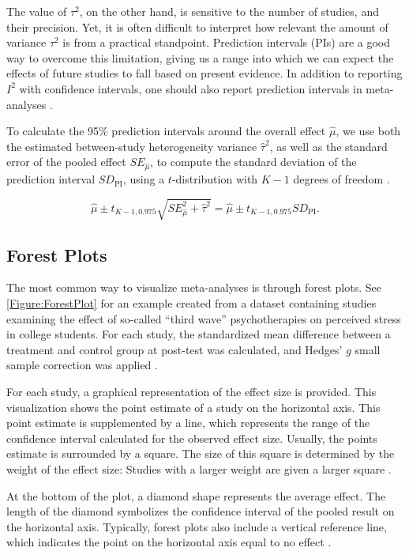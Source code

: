 \documentclass[../../../main.tex]{subfiles}
\begin{document}
The value of $\tau^2$, on the other hand, is sensitive to the number of studies, and their precision. Yet, it is often difficult to interpret how relevant the amount of variance $\tau^2$ is from a practical standpoint. Prediction intervals (PIs) are a good way to overcome this limitation, giving us a range into which we can expect the effects of future studies to fall based on present evidence. In addition to reporting $I^2$ with confidence intervals, one should also report prediction intervals in meta-analyses \autocite{Harrer2021}.

To calculate the 95\% prediction intervals around the overall effect $\hat{\mu}$, we use both the estimated between-study heterogeneity variance $\hat{\tau}^2$, as well as the standard error of the pooled effect $SE_{\hat{\mu}}$, to compute the standard deviation of the prediction interval $SD_\text{PI}$, using a $t$-distribution with $K-1$ degrees of freedom \autocite{Harrer2021}.

\begin{equation}
\hat{\mu} \pm t_{K-1,0.975}\sqrt{SE_{\hat{\mu}}^2+\hat{\tau}^2} = \hat{\mu} \pm t_{K-1,0.975}SD_\text{PI}.
\end{equation}

\subsection{Forest Plots}

The most common way to visualize meta-analyses is through forest plots. See \autoref{Figure:ForestPlot} for an example created from a dataset containing studies examining the effect of so-called ``third wave'' psychotherapies on perceived stress in college students. For each study, the standardized mean difference between a treatment and control group at post-test was calculated, and Hedges' $g$ small sample correction was applied \autocite{Harrer2021}.

For each study, a graphical representation of the effect size is provided. This visualization shows the point estimate of a study on the horizontal axis. This point estimate is supplemented by a line, which represents the range of the confidence interval calculated for the observed effect size. Usually, the points estimate is surrounded by a square. The size of this square is determined by the weight of the effect size: Studies with a larger weight are given a larger square \autocite{Harrer2021}.

At the bottom of the plot, a diamond shape represents the average effect. The length of the diamond symbolizes the confidence interval of the pooled result on the horizontal axis. Typically, forest plots also include a vertical reference line, which indicates the point on the horizontal axis equal to no effect \autocite{Harrer2021}. 
\end{document}
